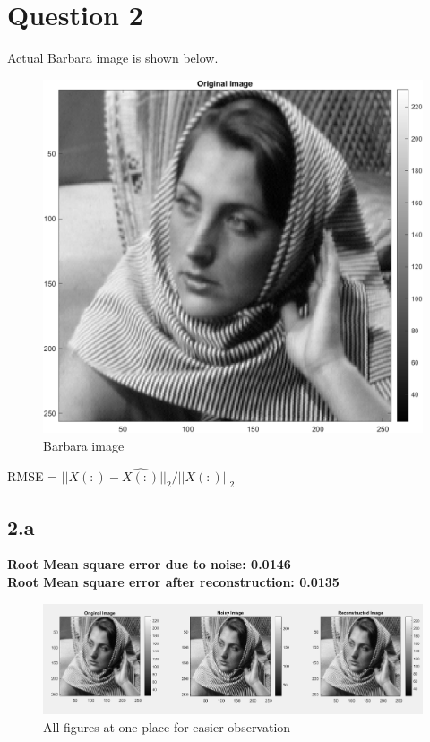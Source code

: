 \documentclass[12pt]{article}
\begin{document}
\section*{Question 2}
Actual Barbara image is shown below.
\begin{figure}[H]
  \centering
  \includegraphics[scale=0.5]{barbara.png}  %
  \caption{Barbara image}
  \label{fig:1}
\end{figure}
RMSE = $||X(:) - \hat{X(:)}||_2/||X(:)||_2$
\subsection*{2.a}
\textbf{Root Mean square error due to noise: 0.0146}\\
\textbf{Root Mean square error after reconstruction: 0.0135}
\begin{figure}[H]
  \centering
  \includegraphics[scale=0.4]{fig2a.png}  %
  \caption{All figures at one place for easier observation}
  \label{fig:2}
\end{figure}
\clearpage
\end{document}
